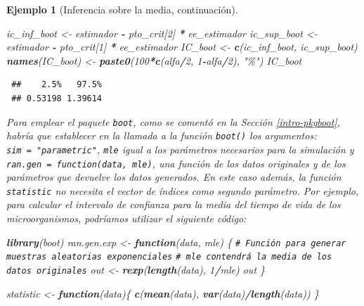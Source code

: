 \documentclass[
  spanish,
  10pt,
]{book}
\newenvironment{Shaded}{\begin{snugshade}}{\end{snugshade}}
\newcommand{\CommentTok}[1]{\textcolor[rgb]{0.56,0.35,0.01}{\textit{#1}}}
\newcommand{\ControlFlowTok}[1]{\textcolor[rgb]{0.13,0.29,0.53}{\textbf{#1}}}
\newcommand{\DecValTok}[1]{\textcolor[rgb]{0.00,0.00,0.81}{#1}}
\newcommand{\FunctionTok}[1]{\textcolor[rgb]{0.13,0.29,0.53}{\textbf{#1}}}
\newcommand{\NormalTok}[1]{#1}
\newcommand{\OtherTok}[1]{\textcolor[rgb]{0.56,0.35,0.01}{#1}}
\newcommand{\SpecialCharTok}[1]{\textcolor[rgb]{0.81,0.36,0.00}{\textbf{#1}}}
\newcommand{\StringTok}[1]{\textcolor[rgb]{0.31,0.60,0.02}{#1}}
\theoremstyle{break}
\newtheorem{example}{Ejemplo}[chapter]
\theoremstyle{nonumberplain}
\renewcommand{\CommentTok}[1]{\textcolor[rgb]{0.41,0.41,0.41}{\texttt{#1}}}
\begin{document}
\begin{example}[Inferencia sobre la media, continuación]
\begin{Shaded}
\begin{Highlighting}[]
\NormalTok{ic\_inf\_boot }\OtherTok{\textless{}{-}}\NormalTok{ estimador  }\SpecialCharTok{{-}}\NormalTok{ pto\_crit[}\DecValTok{2}\NormalTok{] }\SpecialCharTok{*}\NormalTok{ ee\_estimador}
\NormalTok{ic\_sup\_boot }\OtherTok{\textless{}{-}}\NormalTok{ estimador  }\SpecialCharTok{{-}}\NormalTok{ pto\_crit[}\DecValTok{1}\NormalTok{] }\SpecialCharTok{*}\NormalTok{ ee\_estimador}
\NormalTok{IC\_boot }\OtherTok{\textless{}{-}} \FunctionTok{c}\NormalTok{(ic\_inf\_boot, ic\_sup\_boot)}
\FunctionTok{names}\NormalTok{(IC\_boot) }\OtherTok{\textless{}{-}} \FunctionTok{paste0}\NormalTok{(}\DecValTok{100}\SpecialCharTok{*}\FunctionTok{c}\NormalTok{(alfa}\SpecialCharTok{/}\DecValTok{2}\NormalTok{, }\DecValTok{1}\SpecialCharTok{{-}}\NormalTok{alfa}\SpecialCharTok{/}\DecValTok{2}\NormalTok{), }\StringTok{"\%"}\NormalTok{)}
\NormalTok{IC\_boot}
\end{Highlighting}
\end{Shaded}

\begin{verbatim}
 ##    2.5%   97.5% 
 ## 0.53198 1.39614
\end{verbatim}

Para emplear el paquete \texttt{boot}, como se comentó en la Sección
\ref{intro-pkgboot}, habría que establecer en la llamada a la
función \texttt{boot()} los argumentos: \texttt{sim\ =\ "parametric"},
\texttt{mle} igual a los parámetros necesarios para la simulación y
\texttt{ran.gen\ =\ function(data,\ mle)}, una función de los datos originales
y de los parámetros que devuelve los datos generados.
En este caso además, la función \texttt{statistic} no necesita el vector
de índices como segundo parámetro.
Por ejemplo, para calcular el intervalo de confianza para la media del
tiempo de vida de los microorganismos, podríamos utilizar el siguiente código:

\begin{Shaded}
\begin{Highlighting}[]
\FunctionTok{library}\NormalTok{(boot)}
\NormalTok{ran.gen.exp }\OtherTok{\textless{}{-}} \ControlFlowTok{function}\NormalTok{(data, mle) \{}
    \CommentTok{\# Función para generar muestras aleatorias exponenciales}
    \CommentTok{\# mle contendrá la media de los datos originales}
\NormalTok{    out }\OtherTok{\textless{}{-}} \FunctionTok{rexp}\NormalTok{(}\FunctionTok{length}\NormalTok{(data), }\DecValTok{1}\SpecialCharTok{/}\NormalTok{mle)}
\NormalTok{    out}
\NormalTok{\}}

\NormalTok{statistic }\OtherTok{\textless{}{-}} \ControlFlowTok{function}\NormalTok{(data)\{}
    \FunctionTok{c}\NormalTok{(}\FunctionTok{mean}\NormalTok{(data), }\FunctionTok{var}\NormalTok{(data)}\SpecialCharTok{/}\FunctionTok{length}\NormalTok{(data))}
\NormalTok{\}}


\end{Highlighting}
\end{Shaded}
\end{example}
\end{document}
